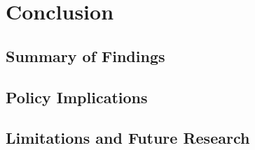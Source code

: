 \section{Conclusion}

\subsection{Summary of Findings}

\subsection{Policy Implications}

\subsection{Limitations and Future Research}
